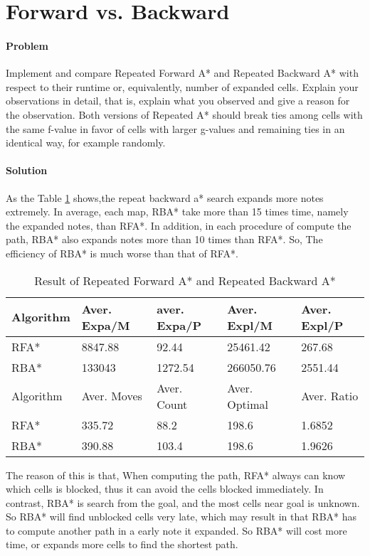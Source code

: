 \section{Forward vs. Backward}

\paragraph{Problem}
Implement and compare Repeated Forward A* and Repeated Backward A* with respect
to their runtime or, equivalently, number of expanded cells. Explain your
observations in detail, that is, explain what you observed and give a reason
for the observation. Both versions of Repeated A* should break ties among cells
with the same f-value in favor of cells with larger g-values and remaining ties
in an identical way, for example randomly.

\paragraph{Solution}

As the Table \ref{tbl:rfa-rba} shows,the repeat backward a* search expands
more notes extremely. In average, each map, RBA* take more than 15 times time,
namely the expanded notes, than RFA*. In addition, in each procedure of compute
the path, RBA* also expands notes more than 10 times than RFA*. So, The
efficiency of RBA* is much worse than that of RFA*.

\begin{table}[h!]
\centering
\caption{Result of Repeated Forward A* and Repeated Backward A*}
\begin{tabular}{|l|l|l|l|l|}
\hline
Algorithm & Aver. Expa/M & aver. Expa/P & Aver. Expl/M & Aver. Expl/P \\
\hline
RFA* & 8847.88 & 92.44 & 25461.42 & 267.68 \\
\hline
RBA* & 133043 & 1272.54 & 266050.76 & 2551.44 \\
\hhline{|=|=|=|=|=|}
Algorithm & Aver. Moves & Aver. Count & Aver. Optimal & Aver. Ratio \\
\hline
RFA* & 335.72 & 88.2 & 198.6 & 1.6852 \\
\hline
RBA* & 390.88 & 103.4 & 198.6 & 1.9626 \\
\hline
\end{tabular}
\label{tbl:rfa-rba}
\end{table}

The reason of this is that, When computing the path, RFA* always can know which
cells is blocked, thus it can avoid the cells blocked immediately. In contrast,
RBA* is search from the goal, and the most cells near goal is unknown. So RBA*
will find unblocked cells very late, which may result in that RBA* has to
compute another path in a early note it expanded. So RBA* will cost more time,
or expands more cells to find the shortest path.

